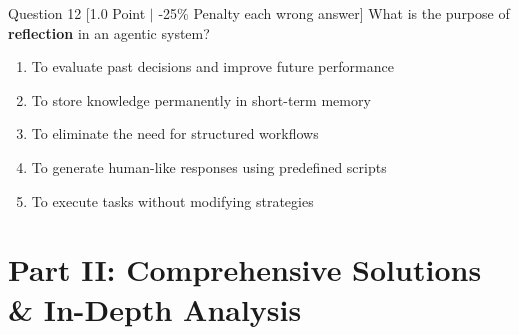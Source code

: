 \documentclass[11pt,a4paper]{article}
\begin{document}
\bigskip

\begin{questionbox}{Question 12 \hfill [1.0 Point $\vert$ -25\% Penalty each wrong answer]}
What is the purpose of \textbf{reflection} in an agentic system?
\begin{enumerate}[label=(\alph*)]
    \item To evaluate past decisions and improve future performance
    \item To store knowledge permanently in short-term memory
    \item To eliminate the need for structured workflows
    \item To generate human-like responses using predefined scripts
    \item To execute tasks without modifying strategies
\end{enumerate}
\end{questionbox}

\newpage

\section{Part II: Comprehensive Solutions \& In-Depth Analysis}
\end{document}
